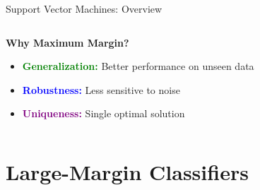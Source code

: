 \documentclass[8pt,aspectratio=1610]{beamer}
\begin{document}
\begin{frame}{Support Vector Machines: Overview}
\begin{columns}[t]
\begin{column}{0.48\textwidth}
\vspace{0.2cm}
\textbf{Why Maximum Margin?}
\begin{itemize}
\setlength{\itemsep}{1pt}
\item \textcolor{green}{\textbf{Generalization:}} Better performance on unseen data
\item \textcolor{blue}{\textbf{Robustness:}} Less sensitive to noise
\item \textcolor{purple}{\textbf{Uniqueness:}} Single optimal solution
\end{itemize}
\end{column}
\end{columns}
\end{frame}

\section{Large-Margin Classifiers}
\end{document}
